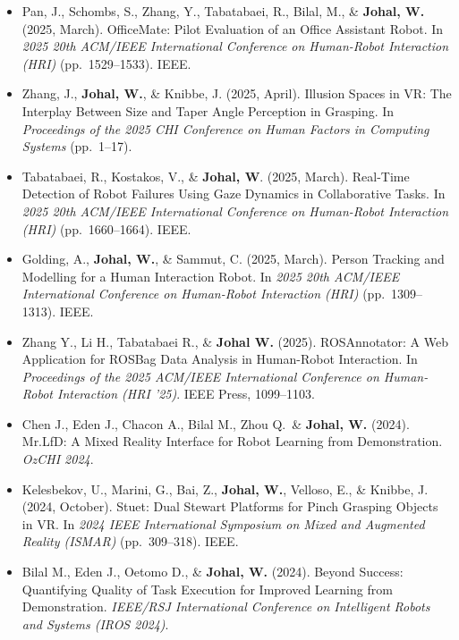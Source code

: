 \begin{itemize}[nosep]
    \item Pan, J., Schombs, S., Zhang, Y., Tabatabaei, R., Bilal, M., \& \textbf{Johal, W.} (2025, March). OfficeMate: Pilot Evaluation of an Office Assistant Robot. In \textit{2025 20th ACM/IEEE International Conference on Human-Robot Interaction (HRI)} (pp.\ 1529--1533). IEEE.

    \item Zhang, J., \textbf{Johal, W.}, \& Knibbe, J. (2025, April). Illusion Spaces in VR: The Interplay Between Size and Taper Angle Perception in Grasping. In \textit{Proceedings of the 2025 CHI Conference on Human Factors in Computing Systems} (pp.\ 1--17).

    \item Tabatabaei, R., Kostakos, V., \& \textbf{Johal, W}. (2025, March). Real-Time Detection of Robot Failures Using Gaze Dynamics in Collaborative Tasks. In \textit{2025 20th ACM/IEEE International Conference on Human-Robot Interaction (HRI)} (pp.\ 1660--1664). IEEE.

    \item Golding, A., \textbf{Johal, W.}, \& Sammut, C. (2025, March). Person Tracking and Modelling for a Human Interaction Robot. In \textit{2025 20th ACM/IEEE International Conference on Human-Robot Interaction (HRI)} (pp.\ 1309--1313). IEEE.

    \item Zhang Y., Li H., Tabatabaei R., \& \textbf{Johal W.} (2025). ROSAnnotator: A Web Application for ROSBag Data Analysis in Human-Robot Interaction. In \textit{Proceedings of the 2025 ACM/IEEE International Conference on Human-Robot Interaction (HRI '25)}. IEEE Press, 1099--1103.

    \item Chen J., Eden J., Chacon A., Bilal M., Zhou Q.\ \& \textbf{Johal, W.} (2024). Mr.LfD: A Mixed Reality Interface for Robot Learning from Demonstration. \textit{OzCHI 2024}.

    \item Kelesbekov, U., Marini, G., Bai, Z., \textbf{Johal, W.}, Velloso, E., \& Knibbe, J. (2024, October). Stuet: Dual Stewart Platforms for Pinch Grasping Objects in VR. In \textit{2024 IEEE International Symposium on Mixed and Augmented Reality (ISMAR)} (pp.\ 309--318). IEEE.

    \item Bilal M., Eden J., Oetomo D., \& \textbf{Johal, W.} (2024). Beyond Success: Quantifying Quality of Task Execution for Improved Learning from Demonstration. \textit{IEEE/RSJ International Conference on Intelligent Robots and Systems (IROS 2024)}.


\end{itemize}
